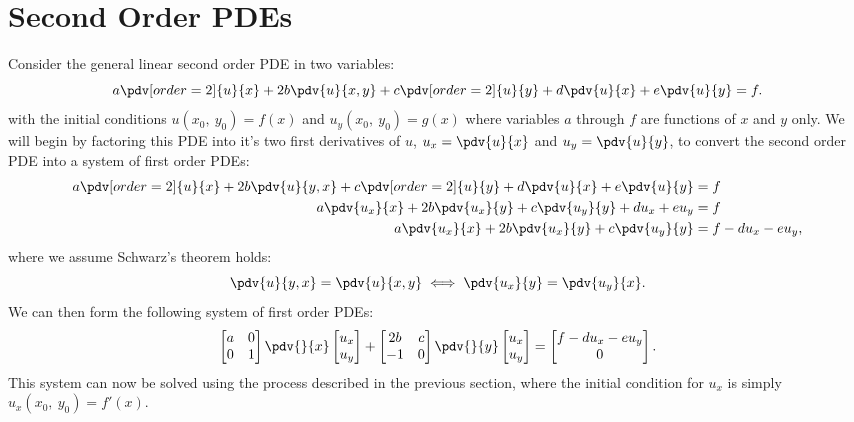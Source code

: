 \documentclass{article}
\theoremstyle{definition}
\begin{document}
\section{Second Order PDEs}
Consider the general linear second order PDE in two variables:
\begin{equation*}
    a \pdv[order=2]{u}{x} + 2b \pdv{u}{x,y} + c \pdv[order=2]{u}{y} + d \pdv{u}{x} + e \pdv{u}{y} = f.
\end{equation*}
with the initial conditions \(u\left( x_0,\: y_0 \right) = f\left( x \right)\)
and \(u_y\left( x_0,\: y_0 \right) = g\left( x \right)\) where variables
\(a\) through \(f\) are functions of \(x\) and \(y\) only. We will begin
by factoring this PDE into it's two first derivatives of \(u\),
\(u_x = \pdv{u}{x}\) and \(u_y = \pdv{u}{y}\), to convert the second
order PDE into a system of first order PDEs:
\begin{align*}
    a \pdv[order=2]{u}{x} + 2b \pdv{u}{y,x} + c \pdv[order=2]{u}{y} + d \pdv{u}{x} + e \pdv{u}{y} & = f                  \\
    a \pdv{u_x}{x} + 2b \pdv{u_x}{y} + c \pdv{u_y}{y} + d u_x + e u_y                             & = f                  \\
    a \pdv{u_x}{x} + 2b \pdv{u_x}{y} + c \pdv{u_y}{y}                                             & = f - d u_x - e u_y,
\end{align*}
where we assume Schwarz's theorem holds:
\begin{equation*}
    \pdv{u}{y,x} = \pdv{u}{x,y} \iff \pdv{u_x}{y} = \pdv{u_y}{x}.
\end{equation*}
We can then form the following system of first order PDEs:
\begin{equation*}
    \begin{bmatrix}
        a & 0 \\
        0 & 1
    \end{bmatrix}
    \pdv{}{x}
    \begin{bmatrix}
        u_x \\
        u_y
    \end{bmatrix}
    +
    \begin{bmatrix}
        2b & c \\
        -1 & 0
    \end{bmatrix}
    \pdv{}{y}
    \begin{bmatrix}
        u_x \\
        u_y
    \end{bmatrix}
    =
    \begin{bmatrix}
        f - d u_x - e u_y \\
        0
    \end{bmatrix}
    .
\end{equation*}
This system can now be solved using the process described in the
previous section, where the initial condition for \(u_x\) is simply
\(u_x\left( x_0,\: y_0 \right) = f'\left( x \right)\).
\end{document}
